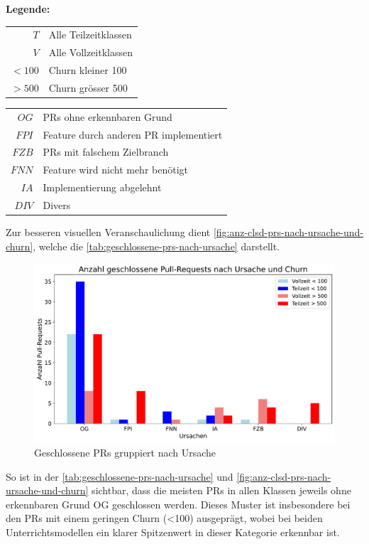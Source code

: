 \textbf{Legende:}

\noindent
\begin{minipage}[t]{0.3\textwidth}
\begin{tabular}{r l}
$T$ & Alle Teilzeitklassen \\
$V$ & Alle Vollzeitklassen \\
$< 100$ & Churn kleiner 100 \\
$> 500$ & Churn grösser 500 \\
\end{tabular}
\end{minipage}
\hfill
\begin{minipage}[t]{0.6\textwidth}
\begin{tabular}{r l}
$OG$ & PRs ohne erkennbaren Grund \\
$FPI$ & Feature durch anderen PR im\-plementiert \\
$FZB$ & PRs mit falschem Zielbranch \\
$FNN$ & Feature wird nicht mehr benötigt \\
$IA$ & Implementierung abgelehnt  \\
$DIV$ & Divers \\
\end{tabular}
\end{minipage}


Zur besseren visuellen Veranschaulichung dient \autoref{fig:anz-clsd-prs-nach-ursache-und-churn}, welche die \autoref{tab:geschlossene-prs-nach-ursache} darstellt.


\begin{figure}[htbp]
    \includegraphics[width=\textwidth]{Figures/ursachenanalyse.pdf}
    \caption{Geschlossene PRs gruppiert nach Ursache}
    \label{fig:anz-clsd-prs-nach-ursache-und-churn}
\end{figure}
So ist in der \autoref{tab:geschlossene-prs-nach-ursache} und \autoref{fig:anz-clsd-prs-nach-ursache-und-churn} sichtbar, dass die meisten PRs in allen Klassen jeweils ohne erkennbaren Grund OG geschlossen werden. Dieses Muster ist insbesondere bei den PRs mit einem geringen Churn (<100) ausgeprägt, wobei bei beiden Unterrichtsmodellen ein klarer Spitzenwert in dieser Kategorie erkennbar ist.


